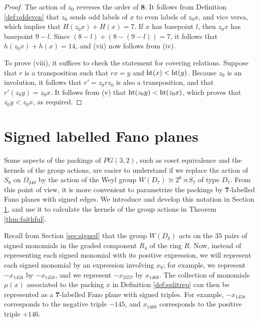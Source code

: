 \documentclass{amsart}
\theoremstyle{plain}
\theoremstyle{definition}
\theoremstyle{remark}
\numberwithin{equation}{section}
\newcommand{\rootht}{\text{\rm ht}}
\newcommand{\seven}{{\mathbf 7}}
\newcommand{\eight}{{\mathbf 8}}
\newcommand{\qpx}{\Omega_{240}}
\begin{document}
\begin{proof}
The action of $z_0$ reverses the order of $\eight$. It follows from Definition \ref{def:oddeven} that $z_0$ sends
odd labels of $x$ to even labels of $z_0 x$, and vice versa, which implies that $H(z_0 x) + H(x) = 7$.
If $x$ has basepoint $l$, then $z_0 x$ has basepoint $9-l$. Since $(8-l) + (8-(9-l)) = 7$, it follows that
$h(z_0 x) + h(x) = 14$, and (vii) now follows from (iv).

To prove (viii), it suffices to check the statement for covering relations. Suppose that $r$ is a transposition
such that $rx = y$ and $\rootht(x) < \rootht(y)$. Because $z_0$ is an involution, it follows that $r' = z_0 r z_0$ is
also a transposition, and that $r'(z_0 y) = z_0x$. It follows from (v) that $\rootht(z_0 y) < \rootht(z_0 x)$, 
which proves that $z_0 y < z_0 x$, as required.
\end{proof}

\section{Signed labelled Fano planes}\label{sec:d7}

Some aspects of the packings of $PG(3, 2)$, such as coset equivalence and the kernels of the group actions, 
are easier to understand if we replace the action of $S_8$ on $\qpx$ by the action of the Weyl group 
$W(D_7) \cong 2^6 \rtimes S_7$ of type $D_7$. From this point of view, it is more convenient to parametrize the 
packings by $\seven$-labelled Fano planes with signed edges. We introduce and develop this notation in 
Section \ref{sec:d7}, and use it to calculate the kernels of the group actions in Theorem \ref{thm:faithful}.

Recall from Section \ref{sec:signed} that the group $W(D_8)$ acts on the $35$ pairs of signed monomials in the graded
component $R_4$ of the ring $R$. Now, instead of representing each signed monomial with its positive expression,
we will represent each signed monomial by an expression involving $x_8$; for example, we represent
$-x_{1458}$ by $-x_{1458}$, and we represent $-x_{2357}$ by $x_{1468}$. The collection of monomials $\mu(x)$
associated to the packing $x$ in Definition \ref{def:splitrep} can then be represented as a $\seven$-labelled
Fano plane with signed triples. For example, $-x_{1458}$ corresponds to the negative triple $-145$, and
$x_{1468}$ corresponds to the positive triple $+146$.
\end{document}
